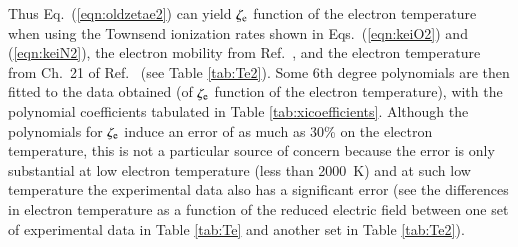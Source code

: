 \documentclass{warpdoc}
\let\citen\cite
\begin{document}
Thus Eq.\ (\ref{eqn:oldzetae2}) can yield $\zeta_{\rm e}$ function of the electron temperature when using the Townsend ionization rates shown in Eqs.\ (\ref{eqn:keiO2}) and (\ref{eqn:keiN2}), the electron mobility from Ref.\ \cite{jcp:2014:parent}, and the electron temperature from Ch.\ 21 of Ref.\ \citen{book:1997:grigoriev} (see Table \ref{tab:Te2}). Some 6th degree polynomials are then fitted to the data obtained (of $\zeta_{\rm e}$ function of the electron temperature), with the polynomial coefficients tabulated in Table \ref{tab:xicoefficients}. Although the polynomials for $\zeta_{\rm e}$ induce an error of as much as 30\% on the electron temperature, this is not a particular source of concern because the error is only substantial at low electron temperature (less than 2000~K) and at such low temperature the experimental data also has a significant error (see the differences in electron temperature as a function of the reduced electric field between one set of experimental data in Table \ref{tab:Te} and another set in Table \ref{tab:Te2}).   
\end{document}
